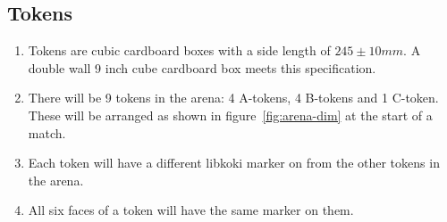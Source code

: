 \subsection{Tokens}
\label{sub:Tokens}
\begin{enumerate}
\item Tokens are cubic cardboard boxes with a side length of $245 \pm 10 mm$. A double wall 9 inch cube cardboard box meets this specification.

\item There will be 9 tokens in the arena: 4 A-tokens, 4 B-tokens and 1 C-token.  These will be arranged as shown in figure~\ref{fig:arena-dim} at the start of a match.

\item Each token will have a different libkoki marker on from the other tokens in the arena.

\item All six faces of a token will have the same marker on them.

\end{enumerate}

\clearpage

